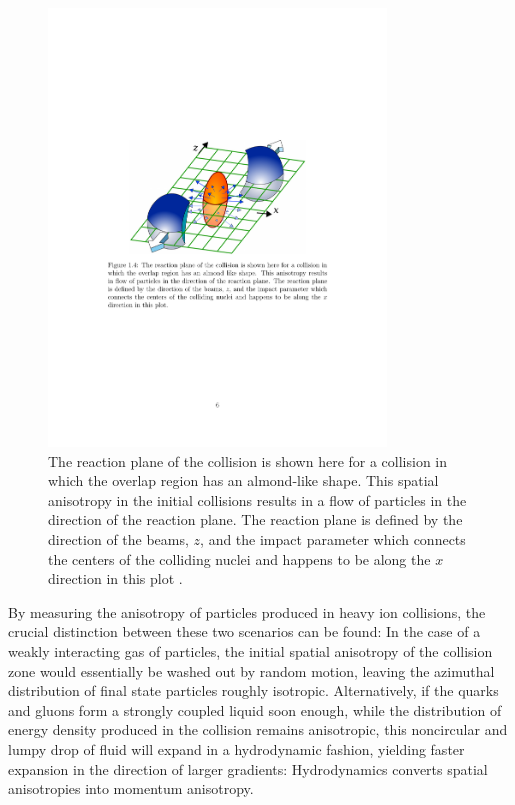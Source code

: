 \begin{figure}[htpb]
  \centering
  \includegraphics[width=0.8\textwidth]{Introduction/overlap_diagram.pdf}
  \caption{The reaction plane of the collision is shown here for a collision in which the overlap region has an almond-like shape. This spatial anisotropy in the initial collisions results in a flow of particles in the direction of the reaction plane. The reaction plane is defined by the direction of the beams, $z$, and the impact parameter which connects the centers of the colliding nuclei and happens to be along the $x$ direction in this plot \cite{Masui}.}
  \label{fig:overlap}
\end{figure}

By measuring the anisotropy of particles produced in heavy ion collisions, the crucial distinction between these two scenarios can be found: In the case of a weakly interacting gas of particles, the initial spatial anisotropy of the collision zone would essentially be washed out by random motion, leaving the azimuthal distribution of final state particles roughly isotropic. Alternatively, if the quarks and gluons form a strongly coupled liquid soon enough, while the distribution of energy density produced in the collision remains anisotropic, this noncircular and lumpy drop of fluid will expand in a hydrodynamic fashion, yielding faster expansion in the direction of larger gradients: Hydrodynamics converts spatial anisotropies into momentum anisotropy.

